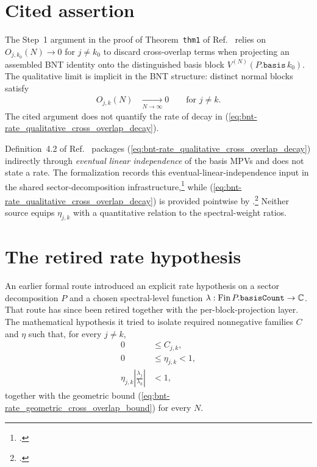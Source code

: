 \documentclass{article}
\begin{document}
\section{Cited assertion}

The Step~1 argument in the proof of Theorem~\texttt{thm1} of
Ref.~\cite[line~1182]{Cirac2016MPDO_arXiv} relies on
$O_{j,k_0}(N)\to 0$ for $j\ne k_0$ to discard cross-overlap terms when
projecting an assembled BNT identity onto the distinguished basis block
$V^{(N)}(P.\mathtt{basis}\,k_0)$. The qualitative limit is implicit in the BNT
structure: distinct normal blocks satisfy
\begin{align}
    O_{j,k}(N)
        &\xrightarrow[N\to\infty]{}0
        \qquad\text{for }j\ne k.
    \label{eq:bnt-rate_qualitative_cross_overlap_decay}
\end{align}
The cited argument does not quantify the rate of decay in
(\ref{eq:bnt-rate_qualitative_cross_overlap_decay}).

Definition~4.2 of Ref.~\cite{Cirac2021Matrix} packages
(\ref{eq:bnt-rate_qualitative_cross_overlap_decay}) indirectly through
\emph{eventual linear independence} of the basis MPVs and does not state a
rate. The formalization records this eventual-linear-independence input in the
shared sector-decomposition infrastructure,\footnote{%
    .}
while (\ref{eq:bnt-rate_qualitative_cross_overlap_decay}) is provided
pointwise by
.\footnote{%
    .}
Neither source equips $\eta_{j,k}$ with a quantitative relation to the
spectral-weight ratios.

\section{The retired rate hypothesis}

An earlier formal route introduced an explicit rate hypothesis on a sector
decomposition $P$ and a chosen spectral-level function
$\lambda:\mathrm{Fin}\,P.\mathtt{basisCount}\to\mathbb{C}$. That route has since been
retired together with the per-block-projection layer. The mathematical
hypothesis it tried to isolate required nonnegative families $C$ and $\eta$
such that, for every $j\ne k$,
\begin{align}
    0
        &\leq C_{j,k},
    \label{eq:bnt-rate_nonnegative_prefactor}\\
    0
        &\leq \eta_{j,k}<1,
    \label{eq:bnt-rate_contracting_rate}\\
    \eta_{j,k}\left|\frac{\lambda_j}{\lambda_k}\right|
        &<1,
    \label{eq:bnt-rate_weight_compatibility}
\end{align}
together with the geometric bound
(\ref{eq:bnt-rate_geometric_cross_overlap_bound}) for every $N$.
\end{document}

